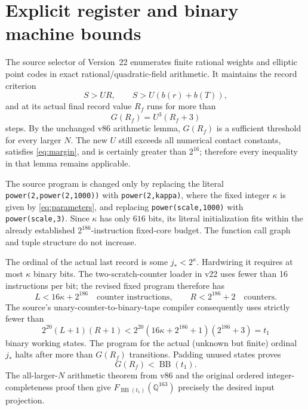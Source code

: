 \documentclass[11pt]{article}
\newcommand{\Q}{\mathbb Q}
\newcommand{\BB}{\operatorname{BB}}
\begin{document}
\section{Explicit register and binary machine bounds}
The source selector of Version~22 enumerates finite rational weights
and elliptic point codes in exact rational/quadratic-field arithmetic.
It maintains the record criterion
\[
 S>UR,\qquad S>U(b(r)+b(T)),
\]
and at its actual final record value $R_f$ runs for more than
\[
 G(R_f)=U^3(R_f+3)
\]
steps. By the unchanged v86 arithmetic lemma, $G(R_f)$ is a
sufficient threshold for every larger $N$.
The new $U$ still exceeds all numerical contact constants, satisfies
\eqref{eq:margin}, and is certainly greater than $2^{16}$;
therefore every inequality in that lemma remains applicable.

The source program is changed only by replacing the literal
\texttt{power(2,power(2,1000))} with
\texttt{power(2,kappa)}, where the fixed integer $\kappa$ is
given by \eqref{eq:parameters}, and replacing
\texttt{power(scale,1000)} with \texttt{power(scale,3)}.
Since $\kappa$ has only $616$ bits, its literal initialization fits
within the already established $2^{186}$-instruction fixed-core
budget. The function call graph and tuple structure do not increase.

The ordinal of the actual last record is some $j_*<2^\kappa$.
Hardwiring it requires at most $\kappa$ binary bits.
The two-scratch-counter loader in v22 uses fewer than 16 instructions
per bit; the revised fixed program therefore has
\[
 L<16\kappa+2^{186}\quad\text{counter instructions},
 \qquad R<2^{186}+2\quad\text{counters}.
\]
The source's unary-counter-to-binary-tape compiler consequently
uses strictly fewer than
\[
 2^{20}(L+1)(R+1)
 <2^{20}(16\kappa+2^{186}+1)(2^{186}+3)=t_1
\]
binary working states. The program for the actual (unknown but finite)
ordinal $j_*$ halts after more than $G(R_f)$ transitions.
Padding unused states proves
\[
 G(R_f)<\BB(t_1).
\]
The all-larger-$N$ arithmetic theorem from v86 and the original
ordered integer-completeness proof then give
$F_{\BB(t_1)}(\Q^{163})$ precisely the desired input projection.
\end{document}
